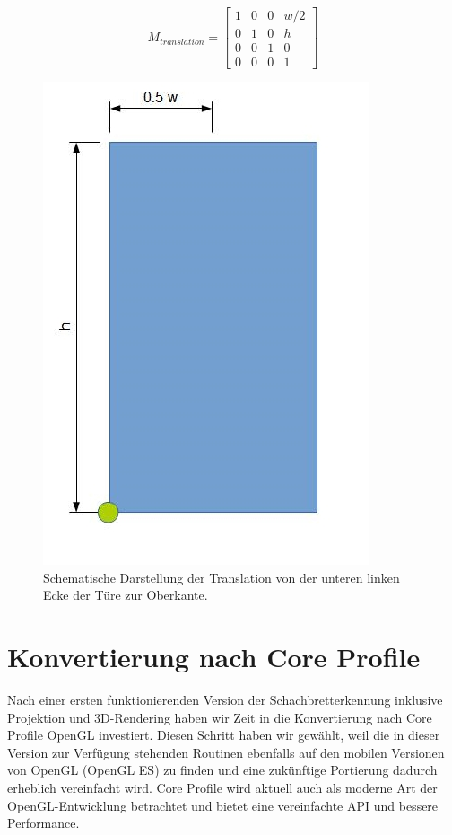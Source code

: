\begin{equation}
M_{translation}
=
\begin{bmatrix}
1 & 0 & 0 & w/2 \\
0 & 1 & 0 & h \\
0 & 0 & 1 & 0 \\
0 & 0 & 0 & 1
\end{bmatrix} 
\end{equation}


\begin{figure}[!ht]
\centering
\includegraphics[scale=0.75]{images/opengl-translation.jpg} 
\caption{Schematische Darstellung der Translation von der unteren linken Ecke der Türe zur Oberkante.}
\label{fig:opencv-perspektive}
\end{figure}


\section{Konvertierung nach Core Profile}

Nach einer ersten funktionierenden Version der Schachbretterkennung inklusive Projektion und 3D-Rendering haben wir Zeit in die Konvertierung nach Core Profile OpenGL investiert. Diesen Schritt haben wir gewählt, weil die in dieser Version zur Verfügung stehenden Routinen ebenfalls auf den mobilen Versionen von OpenGL (OpenGL ES) zu finden und eine zukünftige Portierung dadurch erheblich vereinfacht wird. Core Profile wird aktuell auch als moderne Art der OpenGL-Entwicklung betrachtet und bietet eine vereinfachte API und bessere Performance.


